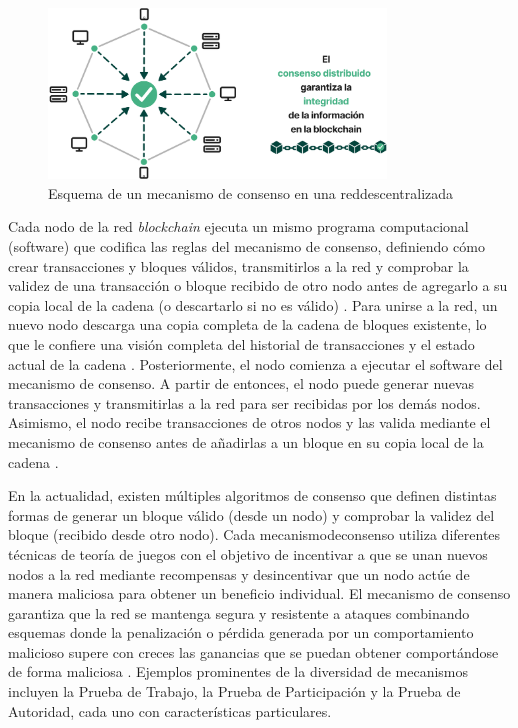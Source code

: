 \begin{figure}[!bt]
    \centering
    \includegraphics[width=0.8\textwidth]{Figures/decentralized-consensus.png}
    \caption{Esquema de un mecanismo de consenso en una \gls{reddescentralizada}}
    \label{fig:decentralized-consensus}
\end{figure}

Cada \gls{nodo} de la red \textit{blockchain} ejecuta un mismo programa computacional (\gls{software}) que codifica las reglas del mecanismo de consenso, definiendo cómo crear transacciones y bloques válidos, transmitirlos a la red y comprobar la validez de una transacción o bloque recibido de otro nodo antes de agregarlo a su copia local de la cadena (o descartarlo si no es válido) \cite{bartolomeo2020introduccion}. Para unirse a la red, un nuevo nodo descarga una copia completa de la cadena de bloques existente, lo que le confiere una visión completa del historial de transacciones y el estado actual de la cadena \cite{bulkowska2023implementation}. Posteriormente, el nodo comienza a ejecutar el software del mecanismo de consenso. A partir de entonces, el nodo puede generar nuevas transacciones y transmitirlas a la red para ser recibidas por los demás nodos. Asimismo, el nodo recibe transacciones de otros nodos y las valida mediante el mecanismo de consenso antes de añadirlas a un bloque en su copia local de la cadena \cite{bulkowska2023implementation}.

En la actualidad, existen múltiples algoritmos de consenso que definen distintas formas de generar un bloque válido (desde un nodo) y comprobar la validez del bloque (recibido desde otro nodo). Cada \gls{mecanismodeconsenso} utiliza diferentes técnicas de teoría de juegos con el objetivo de incentivar a que se unan nuevos nodos a la red mediante recompensas y desincentivar que un nodo actúe de manera maliciosa para obtener un beneficio individual. El mecanismo de consenso garantiza que la red se mantenga segura y resistente a ataques combinando esquemas donde la penalización o pérdida generada por un comportamiento malicioso supere con creces las ganancias que se puedan obtener comportándose de forma maliciosa \cite{satoshi2008bitcoin}. Ejemplos prominentes de la diversidad de mecanismos incluyen la Prueba de Trabajo, la Prueba de Participación y la Prueba de Autoridad, cada uno con características particulares.

